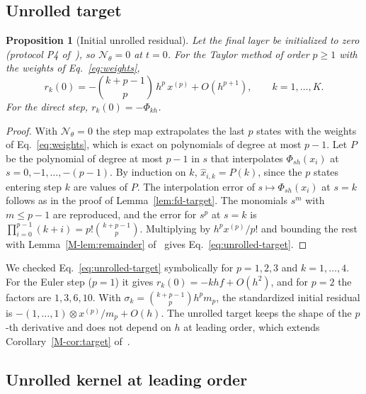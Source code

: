 \documentclass[11pt]{article}
\newcommand{\Mref}[1]{\ref{M-#1} of~\cite{main}}
\newtheorem{proposition}{Proposition}
\theoremstyle{definition}
\theoremstyle{remark}
\newcommand{\Net}{\mathcal{N}_\theta}
\begin{document}
\subsection{Unrolled target}\label{sec:unrolled-target}

\begin{proposition}[Initial unrolled residual]\label{prop:unrolled-target}
Let the final layer be initialized to zero (protocol P4 of~\cite{main}), so $\Net = 0$ at $t = 0$.
For the Taylor method of order $p \ge 1$ with the weights of Eq.~\eqref{eq:weights},
\begin{equation}\label{eq:unrolled-target}
r_k(0) = -\binom{k+p-1}{p}\,h^p\,x^{(p)} + O(h^{p+1}), \qquad k = 1, \dots, K .
\end{equation}
For the direct step, $r_k(0) = -\Phi_{kh}$.
\end{proposition}

\begin{proof}
With $\Net = 0$ the step map extrapolates the last $p$ states with the weights of Eq.~\eqref{eq:weights}, which is exact on polynomials of degree at most $p-1$.
Let $P$ be the polynomial of degree at most $p-1$ in $s$ that interpolates $\Phi_{sh}(x_i)$ at $s = 0, -1, \dots, -(p-1)$.
By induction on $k$, $\hat x_{i,k} = P(k)$, since the $p$ states entering step $k$ are values of $P$.
The interpolation error of $s \mapsto \Phi_{sh}(x_i)$ at $s = k$ follows as in the proof of Lemma~\ref{lem:fd-target}.
The monomials $s^m$ with $m \le p-1$ are reproduced, and the error for $s^p$ at $s = k$ is $\prod_{i=0}^{p-1}(k+i) = p!\binom{k+p-1}{p}$.
Multiplying by $h^px^{(p)}/p!$ and bounding the rest with Lemma~\Mref{lem:remainder} gives Eq.~\eqref{eq:unrolled-target}.
\end{proof}

We checked Eq.~\eqref{eq:unrolled-target} symbolically for $p = 1, 2, 3$ and $k = 1, \dots, 4$.
For the Euler step ($p = 1$) it gives $r_k(0) = -khf + O(h^2)$, and for $p = 2$ the factors are $1, 3, 6, 10$.
With $\sigma_k = \binom{k+p-1}{p}h^pm_p$, the standardized initial residual is $-(1, \dots, 1)\otimes x^{(p)}/m_p + O(h)$.
The unrolled target keeps the shape of the $p$-th derivative and does not depend on $h$ at leading order, which extends Corollary~\Mref{cor:target}.

\subsection{Unrolled kernel at leading order}\label{sec:leading-kernel}
\end{document}
